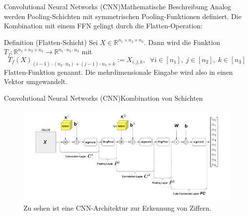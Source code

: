 \documentclass[10pt]{beamer} %
\newcommand{\RR}{\ensuremath{\mathbb{R}}}
\begin{document}
\begin{frame}{Convolutional Neural Networks (CNN)}{Mathematische Beschreibung}
   Analog werden Pooling-Schichten mit symmetrischen Pooling-Funktionen definiert. Die Kombination mit einem FFN gelingt durch die Flatten-Operation:

   \begin{block}{Definition (Flatten-Schicht)}
      Sei $X \in \RR^{n_1 \times n_2 \times n_3}$. Dann wird die Funktion $T_f:\RR^{n_1 \times n_2 \times n_3} \rightarrow \RR^{n_1 \cdot n_2 \cdot n_3}$ mit 
    \begin{equation*}
        T_f(X)_{(i-1) \cdot (n_2 \cdot n_3)+(j-1) \cdot n_3+k}:= X_{i,j,k}, \; \; \forall i \in [n_1],\; j \in [n_2],\; k \in [n_3]
    \end{equation*}
    Flatten-Funktion genannt. Die mehrdimensionale Eingabe wird also in einen Vektor umgewandelt.
   \end{block}
\end{frame}

\begin{frame}{Convolutional Neural Networks (CNN)}{Kombination von Schichten}
   \begin{figure}
      \includegraphics[width=1\textwidth]{pics/modell_arch_anp.png}
      \caption{Zu sehen ist eine CNN-Architektur zur Erkennung von Ziffern.} 
   \end{figure}
\end{frame}
\end{document}
